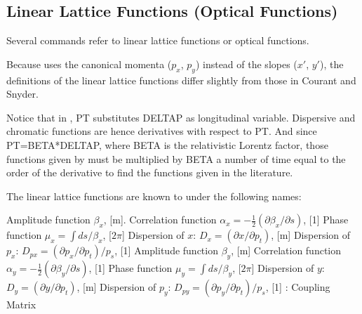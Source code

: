 \subsection{Linear Lattice Functions (Optical Functions)}
\label{subsec:tables_linear}
Several \madx commands refer to linear lattice functions or optical
functions.  

Because \madx uses the canonical momenta ($p_x$, $p_y$) instead of the
slopes ($x'$, $y'$), the definitions of the linear lattice functions
differ slightly from those in Courant and Snyder\cite{Courant_Snyder1958}.

Notice that in \madx, PT substitutes DELTAP as longitudinal
variable. 
Dispersive and chromatic functions are hence derivatives with
respect to PT. 
And since PT=BETA*DELTAP, where BETA is the relativistic Lorentz 
factor, those functions given by \madx must be multiplied by BETA a
number of time equal to the order of the derivative to find the
functions given in the literature. 

The linear lattice functions are known to \madx under the following names:
\begin{madlist}
   Amplitude function $\beta_x$, [m].   
   Correlation function 
  $\alpha_x = - \frac{1}{2} (\partial \beta_x / \partial s)$, [1]   
   Phase function $\mu_x = \int ds / \beta_x$, [$2 \pi$]
   Dispersion of $x$: $D_x = (\partial x / \partial p_t)$, [m] 
   Dispersion of $p_x$: $D_{px} = (\partial p_x / \partial p_t) / p_s$, [1] 
   Amplitude function $\beta_y$, [m]   
   Correlation function 
  $\alpha_y = - \frac{1}{2} ( \partial \beta_y / \partial s)$, [1] 
   Phase function $\mu_y = \int ds / \beta_y$, [$2 \pi$]
   Dispersion of $y$: $D_y = (\partial y / \partial p_t)$, [m] 
   Dispersion of $p_y$: $D_{py} = ( \partial p_y / \partial p_t) / p_s$, [1] 
   : Coupling Matrix     
\end{madlist}



